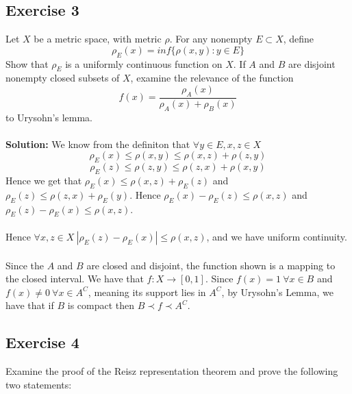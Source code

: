 \documentclass{article}
\begin{document}
\subsection*{Exercise 3}
Let $X$ be a metric space, with metric $\rho$.
For any nonempty $E\subset X$, define
\[
    \rho_E(x) = inf\{ \rho(x,y): y\in E \}
\]
Show that $\rho_E$ is a uniformly continuous function on $X$. If $A$ and $B$ are disjoint nonempty closed
subsets of $X$, examine the relevance of the function
\[
    f(x) = \frac{\rho_A(x)}{\rho_A(x)+\rho_B(x)}
\]
to Urysohn's lemma.
\\\\
\textbf{Solution:}
We know from the definiton that $\forall y\in E, x,z \in X$
\[ \rho_E(x) \le \rho(x,y) \le \rho(x,z) + \rho(z,y) \]
\[ \rho_E(z) \le \rho(z,y) \le \rho(z,x) + \rho(x,y) \]
Hence we get that $\rho_E(x) \le \rho(x,z) + \rho_E(z)$ and $\rho_E(z) \le \rho(z,x) + \rho_E(y)$.
Hence $\rho_E(x) - \rho_E(z) \le \rho(x,z)$ and $\rho_E(z) - \rho_E(x) \le \rho(x,z)$.
\\\\
Hence $\forall x,z \in X \ |\rho_E(z) - \rho_E(x)| \le \rho(x,z)$, and we have uniform continuity.
\\\\
Since the $A$ and $B$ are closed and disjoint, the function shown is a mapping to the closed interval.
We have that $f: X \rightarrow [0,1]$. Since $f(x) = 1 \ \forall x \in B$ and $f(x) \neq 0 \ \forall x \in A^C$, meaning its support lies in $A^C$, by Urysohn's Lemma, we have that if $B$ is compact
then $B \prec f \prec A^C$.

\subsection*{Exercise 4}
Examine the proof of the Reisz representation theorem and prove the following two statements:
\end{document}
